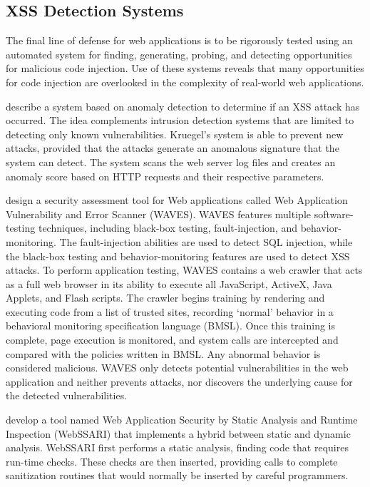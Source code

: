 \documentclass{acmtrans2m}
\begin{document}
\subsection{XSS Detection Systems}
The final line of defense for web applications is to be rigorously tested using an automated system for finding, generating, probing, and detecting opportunities for malicious code injection.
Use of these systems reveals that many opportunities for code injection are overlooked in the complexity of real-world web applications.

 describe a system based on anomaly detection to determine if an XSS attack has occurred.
The idea complements intrusion detection systems that are limited to detecting only known vulnerabilities.
Kruegel's system is able to prevent new attacks, provided that the attacks generate an anomalous signature that the system can detect.
The system scans the web server log files and creates an anomaly score based on HTTP requests and their respective parameters.

 design a security assessment tool for Web applications called Web Application Vulnerability and Error Scanner (WAVES).
WAVES features multiple software-testing techniques, including black-box testing, fault-injection, and behavior-monitoring.
The fault-injection abilities are used to detect SQL injection, while the black-box testing and behavior-monitoring features are used to detect XSS attacks.
To perform application testing, WAVES contains a web crawler that acts as a full web browser in its ability to execute all JavaScript, ActiveX, Java Applets, and Flash scripts.
The crawler begins training by rendering and executing code from a list of trusted sites, recording `normal' behavior in a behavioral monitoring specification language (BMSL).
Once this training is complete, page execution is monitored, and system calls are intercepted and compared with the policies written in BMSL.
Any abnormal behavior is considered malicious.
WAVES only detects potential vulnerabilities in the web application and neither prevents attacks, nor discovers the underlying cause for the detected vulnerabilities.

 develop a tool named Web Application Security by Static Analysis and Runtime Inspection (WebSSARI) that implements a hybrid between static and dynamic analysis.
WebSSARI first performs a static analysis, finding code that requires run-time checks.
These checks are then inserted, providing calls to complete sanitization routines that would normally be inserted by careful programmers.
\end{document}
